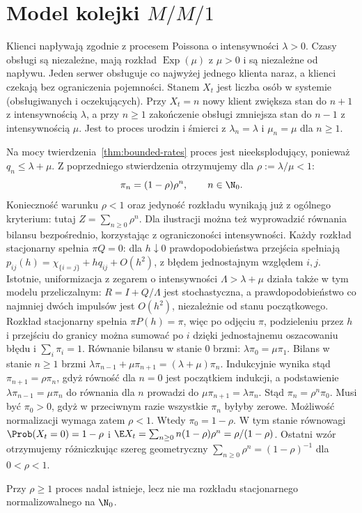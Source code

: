 \section{Model kolejki \texorpdfstring{$M/M/1$}{M/M/1}}
\begin{przyklad}
Klienci napływają zgodnie z procesem Poissona o intensywności
$\lambda>0$. Czasy obsługi są niezależne, mają rozkład
$\operatorname{Exp}(\mu)$ z $\mu>0$ i są niezależne
od napływu. Jeden serwer obsługuje co najwyżej jednego klienta
naraz, a klienci czekają bez ograniczenia pojemności.
Stanem $X_t$ jest liczba osób w systemie (obsługiwanych
i oczekujących). Przy $X_t=n$ nowy klient zwiększa stan do
$n+1$ z intensywnością $\lambda$, a przy $n\ge1$
zakończenie obsługi zmniejsza stan do $n-1$ z intensywnością
$\mu$. Jest to proces urodzin i śmierci z
$\lambda_n=\lambda$ i $\mu_n=\mu$ dla $n\ge1$.

Na mocy twierdzenia~\ref{thm:bounded-rates} proces
jest nieeksplodujący, ponieważ $q_n\le\lambda+\mu$.
Z poprzedniego stwierdzenia otrzymujemy dla
$\rho:=\lambda/\mu<1$:
\[
\pi_n=(1-\rho)\rho^n,\qquad n\in\N_0.
\]
Konieczność warunku $\rho<1$ oraz jedyność rozkładu
wynikają już z ogólnego kryterium: tutaj $Z=\sum_{n\ge0}\rho^n$.
Dla ilustracji można też wyprowadzić równania bilansu
bezpośrednio, korzystając z ograniczoności intensywności.
Każdy rozkład stacjonarny spełnia $\pi Q=0$: dla
$h\downarrow0$ prawdopodobieństwa przejścia spełniają
$p_{ij}(h)=\chi_{\{i=j\}}+hq_{ij}+O(h^2)$,
z błędem jednostajnym względem $i,j$.
Istotnie, uniformizacja z zegarem o intensywności
$\Lambda>\lambda+\mu$ działa także w tym modelu
przeliczalnym: $R=I+Q/\Lambda$ jest stochastyczna,
a prawdopodobieństwo co najmniej dwóch impulsów jest
$O(h^2)$, niezależnie od stanu początkowego.
Rozkład stacjonarny spełnia $\pi P(h)=\pi$,
więc po odjęciu $\pi$, podzieleniu przez $h$ i przejściu
do granicy można sumować po $i$ dzięki jednostajnemu
oszacowaniu błędu i $\sum_i\pi_i=1$.
Równanie bilansu w stanie $0$ brzmi:
$\lambda\pi_0=\mu\pi_1$.
Bilans w stanie $n\ge1$ brzmi
$\lambda\pi_{n-1}+\mu\pi_{n+1}=(\lambda+\mu)\pi_n$.
Indukcyjnie wynika stąd $\pi_{n+1}=\rho\pi_n$, gdyż
równość dla $n=0$ jest początkiem indukcji, a podstawienie
$\lambda\pi_{n-1}=\mu\pi_n$ do równania dla $n$
prowadzi do $\mu\pi_{n+1}=\lambda\pi_n$.
Stąd $\pi_n=\rho^n\pi_0$. Musi być $\pi_0>0$,
gdyż w przeciwnym razie wszystkie $\pi_n$ byłyby zerowe.
Możliwość normalizacji wymaga zatem $\rho<1$. Wtedy $\pi_0=1-\rho$.
W tym stanie równowagi
$\Prob(X_t=0)=1-\rho$ i
$\E X_t=\sum_{n\ge0}n(1-\rho)\rho^n=\rho/(1-\rho)$.
Ostatni wzór otrzymujemy różniczkując szereg geometryczny
$\sum_{n\ge0}\rho^n=(1-\rho)^{-1}$ dla $0<\rho<1$.

Przy $\rho\ge1$
proces nadal istnieje, lecz nie ma rozkładu stacjonarnego
normalizowalnego na $\N_0$.
\end{przyklad}

